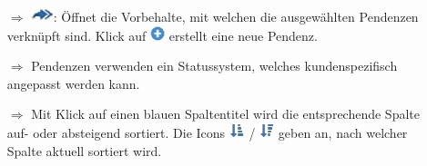 \documentclass{article}
\begin{document}
\begin{multicols}{2}
\begin{tcolorbox}[colback=blue!5,colframe=blue!40!black,title=Pendenzen in der Übersicht]
\begin{itemize}
	\item[$\Longrightarrow$] \includegraphics[height=12pt]{Icons/Doppelpfeil.png}: Öffnet die Vorbehalte, mit welchen die ausgewählten Pendenzen verknüpft sind. Klick auf \includegraphics[height=12pt]{Icons/Plussymbol.png} erstellt eine neue Pendenz.
	\item[$\Longrightarrow$] Pendenzen verwenden ein Statussystem, welches kundenspezifisch angepasst werden kann.
	\item[$\Longrightarrow$] Mit Klick auf einen blauen Spaltentitel wird die entsprechende Spalte auf- oder absteigend sortiert. Die Icons \includegraphics[height=12pt]{Icons/sort_down.png} / \includegraphics[height=12pt]{Icons/sort_up.png} geben an, nach welcher Spalte aktuell sortiert wird.
\end{itemize}
\end{tcolorbox}



\end{multicols}
\end{document}
